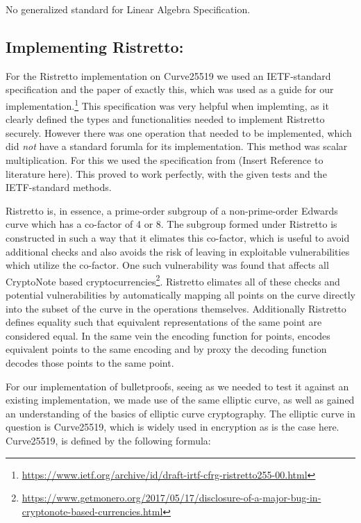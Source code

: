 \documentclass{article}
\begin{document}
No generalized standard for Linear Algebra Specification.

\subsection{Implementing Ristretto:} \label{implementing-ristretto}

For the Ristretto implementation on Curve25519 we used an IETF-standard specification and the paper 
of exactly this, which was used as a guide for our
implementation.\footnote{\url{https://www.ietf.org/archive/id/draft-irtf-cfrg-ristretto255-00.html}}
This specification was very helpful when implemting, as it clearly
defined the types and functionalities needed to implement Ristretto
securely. However there was one operation that needed to be implemented, which did \textit{not} have a standard forumla for its implementation. This method was scalar multiplication. For this we used the specification from (Insert Reference to literature here). This proved to work perfectly, with the given tests and the IETF-standard methods. 

Ristretto is, in essence, a prime-order subgroup of a non-prime-order
Edwards curve which has a co-factor of 4 or 8. The subgroup formed
under Ristretto is constructed in such a way that it elimates this
co-factor, which is useful to avoid additional checks and also
avoids the risk of leaving in exploitable vulnerabilities which
utilize the co-factor. One such vulnerability was found that affects all CryptoNote based cryptocurrencies\footnote{\url{https://www.getmonero.org/2017/05/17/disclosure-of-a-major-bug-in-cryptonote-based-currencies.html}}. Ristretto elimates all of these checks and
potential vulnerabilities by automatically mapping all points on
the curve directly into the subset of the curve in the operations
themselves. Additionally Ristretto defines equality such that equivalent
representations of the same point are considered equal. In the same
vein the encoding function for points, encodes equivalent points to
the same encoding and by proxy the decoding function decodes those
points to the same point.

For our implementation of bulletproofs, seeing as we needed to test it
against an existing implementation, we made use of the same elliptic
curve, as well as gained an understanding of the basics of elliptic
curve cryptography. The elliptic curve in question is Curve25519, which
is widely used in encryption as is the case here. Curve25519, is defined by the following formula:
\end{document}
